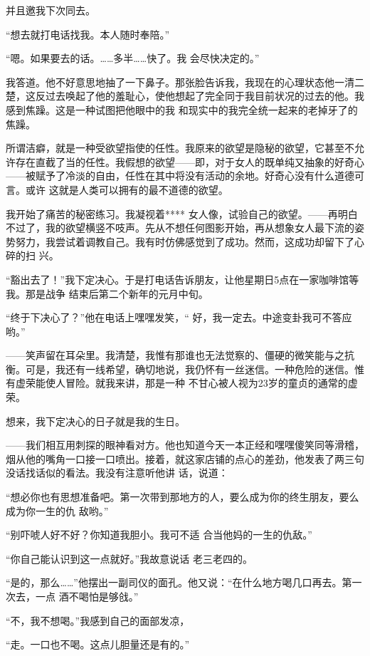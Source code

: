 \documentclass{article}
\begin{document}
并且邀我下次同去。 


“想去就打电话找我。本人随时奉陪。” 

“嗯。如果要去的话。……多半……快了。我
会尽快决定的。” 

我答道。他不好意思地抽了一下鼻子。那张脸告诉我，我现在的心理状态他一清二楚，这反过去唤起了他的羞耻心，使他想起了完全同于我目前状况的过去的他。我感到焦躁。这是一种试图把他眼中的我
和现实中的我完全统一起来的老掉牙了的焦躁。 

所谓洁癖，就是一种受欲望指使的任性。我原来的欲望是隐秘的欲望，它甚至不允许存在直截了当的任性。我假想的欲望——即，对于女人的既单纯又抽象的好奇心——被赋予了冷淡的自由，任性在其中将没有活动的余地。好奇心没有什么道德可言。或许
这就是人类可以拥有的最不道德的欲望。 

我开始了痛苦的秘密练习。我凝视着****
\newpage
女人像，试验自己的欲望。——再明白不过了，我的欲望横竖不吱声。先从不想任何图影开始，再从想象女人最下流的姿势努力，我尝试着调教自己。我有时仿佛感觉到了成功。然而，这成功却留下了心碎的扫
兴。 

“豁出去了！”我下定决心。于是打电话告诉朋友，让他星期日5点在一家咖啡馆等我。那是战争
结束后第二个新年的元月中旬。 

“终于下决心了？”他在电话上嘿嘿发笑，“
好，我一定去。中途变卦我可不答应哟。” 

——笑声留在耳朵里。我清楚，我惟有那谁也无法觉察的、僵硬的微笑能与之抗衡。可是，我还有一线希望，确切地说，我仍怀有一丝迷信。一种危险的迷信。惟有虚荣能使人冒险。就我来讲，那是一种
不甘心被人视为23岁的童贞的通常的虚荣。 


想来，我下定决心的日子就是我的生日。 

\newpage

——我们相互用刺探的眼神看对方。他也知道今天一本正经和嘿嘿傻笑同等滑稽，烟从他的嘴角一口接一口喷出。接着，就这家店铺的点心的差劲，他发表了两三句没话找话似的看法。我没有注意听他讲
话，说道： 

“想必你也有思想准备吧。第一次带到那地方的人，要么成为你的终生朋友，要么成为你一生的仇
敌哟。” 

“别吓唬人好不好？你知道我胆小。我可不适
合当他妈的一生的仇敌。” 

“你自己能认识到这一点就好。”我故意说话
老三老四的。 

“是的，那么……”他摆出一副司仪的面孔。他又说：“在什么地方喝几口再去。第一次去，一点
酒不喝怕是够戗。” 

“不，我不想喝。”我感到自己的面部发凉，
\newpage

“走。一口也不喝。这点儿胆量还是有的。” 
\end{document}
